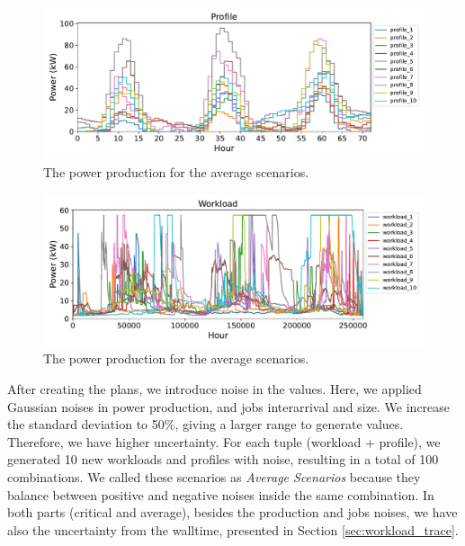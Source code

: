 \begin{figure}[!htb]
    \centering
    \includegraphics[scale=0.58]{Images/Compensations/diff_power_production.pdf}
    \caption{The power production for the average scenarios.}
    \label{fig:average_weather_with_noise}
\end{figure}

\begin{figure}[!htb]
    \centering
    \includegraphics[scale=0.58]{Images/Compensations/diff_jobs_arriving.pdf}
    \caption{The power production for the average scenarios.}
    \label{fig:average_workload_with_noise}
\end{figure}

After creating the plans, we introduce noise in the values. Here, we applied Gaussian noises in power production, and jobs interarrival and size. We increase the standard deviation to 50\%, giving a larger range to generate values. Therefore, we have higher uncertainty. For each tuple (workload + profile), we generated 10 new workloads and profiles with noise, resulting in a total of 100 combinations. We called these scenarios as \emph{Average Scenarios} because they balance between positive and negative noises inside the same combination. In both parts (critical and average), besides the production and jobs noises, we have also the uncertainty from the walltime, presented in Section \ref{sec:workload_trace}.



